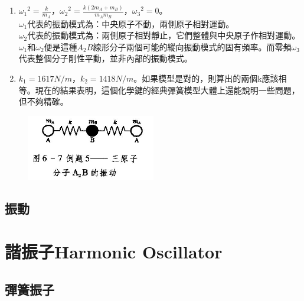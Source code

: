 \documentclass[cn,10pt,math=newtx,chinesefont=founder]{elegantbook}
\begin{document}
\begin{solution}
\begin{enumerate}[label=(\arabic*)]
\item ${\omega_1}^2 = \frac{k}{m_A}$，${\omega_2}^2 = \frac{k(2m_A+m_B)}{m_Am_B}$，${\omega_3}^2 = 0$。\\
$\omega_1$代表的振動模式為：中央原子不動，兩側原子相對運動。\\
$\omega_2$代表的振動模式為：兩側原子相對靜止，它們整體與中央原子作相對運動。\\
$\omega_1$和$\omega_2$便是這種$A_2B$線形分子兩個可能的縱向振動模式的固有頻率。而零頻$\omega_3$代表整個分子剛性平動，並非內部的振動模式。
\item $k_1 = 1617N/m$，$k_2 = 1418N/m$。如果模型是對的，則算出的兩個k應該相等。現在的結果表明，這個化學鍵的經典彈簧模型大體上還能說明一些問題，但不夠精確。
\end{enumerate}
\end{solution}

\begin{figure}[htbp]
\flushright
\includegraphics[width=0.5\textwidth]{image/6-7-5.JPG}
\end{figure}

\newpage

\section{振動}








\chapter{諧振子Harmonic Oscillator}
\section{彈簧振子}
\end{document}
